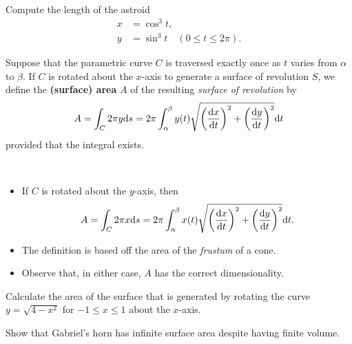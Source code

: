 \newpage

\begin{example}
Compute the length of the astroid
\begin{align*}
x &= \cos^3 t,\\
y &= \sin^3 t\quad (0\le t\le 2\pi).
\end{align*}
\end{example}

\newpage



\begin{definition}
Suppose that the parametric curve $C$ is traversed exactly once as $t$ varies from $\alpha$ to $\beta$.
If $C$ is rotated about the $x$-axis to generate a surface of revolution $S$, we define the \textbf{(surface) area} $A$ of the resulting \textit{surface of revolution} by
\begin{equation*}
A = \int_C 2\pi y\mathrm{d} s =2\pi \int_\alpha^\beta y(t)\sqrt{\left(\frac{\mathrm{d} x}{\mathrm{d} t}\right)^2 + \left(\frac{\mathrm{d} y}{\mathrm{d} t}\right)^2}\mathrm{d} t
\end{equation*}
provided that the integral exists.
\end{definition}

\begin{remark}\,
\begin{itemize}
\item If $C$ is rotated about the $y$-axis, then 
\begin{equation*}
A = \int_C 2\pi x\mathrm{d} s =2\pi \int_\alpha^\beta x(t)\sqrt{\left(\frac{\mathrm{d} x}{\mathrm{d} t}\right)^2 + \left(\frac{\mathrm{d} y}{\mathrm{d} t}\right)^2}\mathrm{d} t.
\end{equation*}
\item The definition is based off the area of the \textit{frustum} of a cone.
\item Observe that, in either case, $A$ has the correct dimensionality.
\end{itemize}
\end{remark}

\newpage

\begin{example}
Calculate the area of the surface that is generated by rotating the curve $y=\sqrt{4-x^2}$ for $-1\le x\le 1$ about the $x$-axis.
\end{example}

\newpage

\begin{example}
Show that Gabriel's horn has infinite surface area despite having finite volume.
\end{example}

